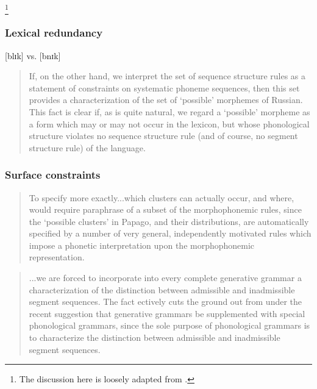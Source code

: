 \footnote{The discussion here is loosely adapted from \citealt{Idsardi2006}.}

\subsubsection{Lexical redundancy} 

\citet[][101]{Chomsky1965}
[blɪk] vs. [bnɪk]

\citet[][101]{Chomsky1965}
\citet{Stanley1967}
\citet{SPE}

\begin{quotation}
If, on the other hand, we interpret the set of sequence structure rules as a statement of constraints on systematic phoneme sequences, then this set provides a characterization of the set of `possible' morphemes of Russian. This fact is clear if, as is quite natural, we regard a `possible'  morpheme as a form which may or may not occur in the lexicon, but whose phonological structure violates no sequence structure rule (and of course, no segment structure rule) of the language. \citep[][401]{Stanley1967}
\end{quotation}

\subsubsection{Surface constraints}

\citeauthor{Hale1965}

\begin{quotation}
To specify more exactly...which clusters can actually occur, and where, would require paraphrase of a subset of the morphophonemic rules, since the `possible clusters' in Papago, and their distributions, are automatically specified by a number of very general, independently motivated rules which impose a phonetic interpretation upon the morphophonemic representation. \citep[][297]{Hale1965}
\end{quotation}

\begin{quotation}
...we are forced to incorporate into every complete generative grammar a characterization of the distinction between admissible and inadmissible segment sequences. The fact ectively cuts the ground out from under the recent suggestion that generative grammars be supplemented with special phonological grammars, since the sole purpose of phonological grammars is to characterize the distinction between admissible and inadmissible segment sequences. \citep[][61-62]{Halle1962}
\end{quotation}

